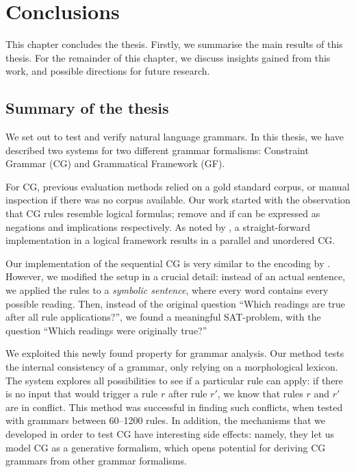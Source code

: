 \chapter{Conclusions}
\label{chapterConclusions}


This chapter concludes the thesis.  Firstly, we summarise the main
results of this thesis.  For the remainder of this chapter, we discuss
insights gained from this work, and possible directions for future
research.

\section{Summary of the thesis}

We set out to test and verify natural language grammars. In this
thesis, we have described two systems for two different grammar
formalisms: Constraint Grammar (CG) and Grammatical Framework (GF).

For CG, previous evaluation methods relied on a gold standard corpus,
or manual inspection if there was no corpus available. Our work
started with the observation that CG rules resemble logical formulas;
{\sc remove} and {\sc if} can be expressed as negations and
implications respectively. As noted by \citet{lager98}, a
straight-forward implementation in a logical framework results in a
parallel and unordered CG.

Our implementation of the sequential CG is very similar to the
encoding by \citet{lager_nivre01}.  However, we modified the setup in
a crucial detail: instead of an actual sentence, we applied the rules
to a {\em symbolic sentence}, where every word contains every possible
reading.  Then, instead of the original question ``Which readings are
true after all rule applications?'', we found a meaningful
SAT-problem, with the question ``Which readings were originally
true?''

We exploited this newly found property for grammar analysis.
Our method tests the internal consistency of a grammar, only relying
on a morphological lexicon. The system explores all possibilities to
see if a particular rule can apply: if there is no input that would
trigger a rule $r$ after rule $r'$, we know that rules $r$ and $r'$
are in conflict. This method was successful in finding such conflicts,
when tested with grammars between 60--1200 rules.  In addition, the
mechanisms that we developed in order to test CG have interesting side
effects: namely, they let us model CG as a generative formalism, which
opens potential for deriving CG grammars from other grammar formalisms.

